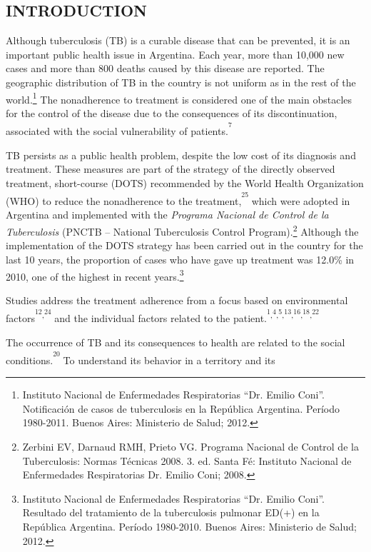 \vspace*{-1.6mm}
{\noindent\fontsize{9}{10.8}\selectfont{Received: 18/2/2014;
Accepted: 2/11/2014.}}
\begin{multicols}{2}
\section*{INTRODUCTION}
\par{}Although tuberculosis (TB) is a curable disease that can be prevented, it is an important public health issue in Argentina. Each year, more than 10,000 new cases and more than 800 deaths caused by this disease are reported. The geographic distribution of TB in the country is not uniform as in the rest of the world.\protect\footnote{ Instituto Nacional de Enfermedades Respiratorias “Dr. Emilio Coni”. Notificación de casos de tuberculosis en la República Argentina. Período 1980-2011. Buenos Aires: Ministerio de Salud; 2012.} The nonadherence to treatment is considered one of the main obstacles for the control of the disease due to the consequences of its discontinuation, associated with the social vulnerability of patients.\textsuperscript{\textsuperscript{7}}\par{}TB persists as a public health problem, despite the low cost of its diagnosis and treatment. These measures are part of the strategy of the directly observed treatment, short-course (DOTS) recommended by the World Health Organization (WHO) to reduce the nonadherence to the treatment,\textsuperscript{\textsuperscript{25}} which were adopted in Argentina and implemented with the \textit{Programa Nacion}\textit{al de Control de la }\textit{Tuberculosis} (PNCTB – National Tuberculosis Control Program).\protect\footnote{ Zerbini EV, Darnaud RMH, Prieto VG. Programa Nacional de Control de la Tuberculosis: Normas Técnicas 2008. 3. ed. Santa Fé: Instituto Nacional de Enfermedades Respiratorias Dr. Emilio Coni; 2008.} Although the implementation of the DOTS strategy has been carried out in the country for the last 10 years, the proportion of cases who have gave up treatment was 12.0\%\allowbreak{} in 2010, one of the highest in recent years.\protect\footnote{ Instituto Nacional de Enfermedades Respiratorias “Dr. Emilio Coni”. Resultado del tratamiento de la tuberculosis pulmonar ED(+) en la República Argentina. Período 1980-2010. Buenos Aires: Ministerio de Salud; 2012.}\par{}Studies address the treatment adherence from a focus based on environmental factors\textsuperscript{\textsuperscript{12}}\textsuperscript{,}\textsuperscript{\textsuperscript{24}} and the individual factors related to the patient.\textsuperscript{\textsuperscript{1}}\textsuperscript{,}\textsuperscript{\textsuperscript{4}}\textsuperscript{,}\textsuperscript{\textsuperscript{5}}\textsuperscript{,}\textsuperscript{\textsuperscript{13}}\textsuperscript{,}\textsuperscript{\textsuperscript{16}}\textsuperscript{,}\textsuperscript{\textsuperscript{18}}\textsuperscript{,}\textsuperscript{\textsuperscript{22}}\par{}The occurrence of TB and its consequences to health are related to the social conditions.\textsuperscript{\textsuperscript{20}} To understand its behavior in a territory and its 
\end{multicols}
